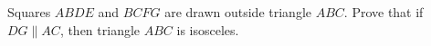 Squares $ABDE$ and $BCFG$ are drawn outside triangle $ABC$. Prove that if $DG\parallel AC$, then triangle $ABC$ is isosceles.
